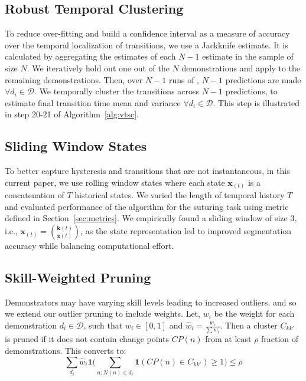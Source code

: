 \documentclass[0-main.tex]{subfiles}
\begin{document}
\subsection{Robust Temporal Clustering}
To reduce over-fitting and build a confidence interval as a measure of accuracy over the temporal localization of transitions, we use a Jackknife estimate. It is calculated by aggregating the estimates of each $N-1$ estimate in the sample of size $N$.
We iteratively hold out one out of the $N$ demonstrations and apply \tsc to the remaining demonstrations. Then, over $N-1$ runs of \tsc, $N-1$ predictions are made $\forall d_i \in \mathcal{D}$. We temporally cluster the transitions across $N-1$ predictions, to estimate final transition time mean and variance $\forall d_i \in \mathcal{D}$. This step is illustrated in step 20-21 of Algorithm~\ref{alg:vtsc}.

\subsection{Sliding Window States}
To better capture hysteresis and transitions that are not instantaneous, in this current paper, we use rolling window states where each state $\mathbf{x}_{(t)}$ is a concatenation of $T$ historical states.
We varied the length of temporal history $T$ and evaluated performance of the \TSC algorithm for the suturing task using metric defined in Section~\ref{sec:metrics}.
We empirically found a sliding window of size 3, i.e.,  $\mathbf{x}_{(t)} = \binom{\mathbf{k}(t)}{\mathbf{z}(t)}$, as the state representation led to improved segmentation accuracy while balancing computational effort. 

\subsection{Skill-Weighted Pruning} 
Demonstrators may have varying skill levels leading to increased outliers, and so we extend our outlier pruning to include weights.
Let, $w_i$ be the weight for each demonstration $d_i \in \mathcal{D}$, such that $w_i \in [0,1]$ and $\hat{w}_i = \frac{w_i}{\sum w_i}$. Then a cluster $C_{kk'}$ is pruned if it does not contain change points $CP(n)$ from at least $\rho$ fraction of demonstrations. This converts to:
\vspace{-3pt}
\[\sum_{d_i} \hat{w}_i\mathbf{1}\Big( \sum_{n:N(n)\in d_i} \mathbf{1}( CP(n) \in C_{kk'}) \geq 1 \Big) \leq \rho 
\]
\vspace{-5pt}


\end{document}
